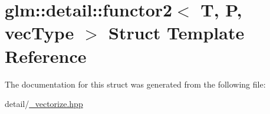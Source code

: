 \hypertarget{structglm_1_1detail_1_1functor2}{\section{glm\-:\-:detail\-:\-:functor2$<$ T, P, vec\-Type $>$ Struct Template Reference}
\label{structglm_1_1detail_1_1functor2}
}


The documentation for this struct was generated from the following file\-:\begin{DoxyCompactItemize}
\item 
detail/\hyperlink{__vectorize_8hpp}{\-\_\-vectorize.\-hpp}\end{DoxyCompactItemize}
